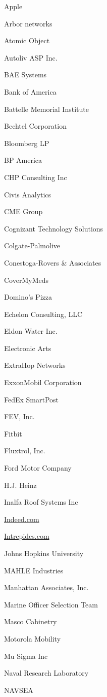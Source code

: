 \documentclass[twoside]{article}
\begin{document}
\begin{center}
\begin{multicols}{5}
\begin{FlushLeft}
\begin{compactitem}
\item Apple
\item Arbor networks
\item Atomic Object
\item Autoliv ASP Inc.
\item BAE Systems
\item Bank of America
\item Battelle Memorial Institute
\item Bechtel Corporation
\item Bloomberg LP
\item BP America
\item CHP Consulting Inc
\item Civis Analytics
\item CME Group
\item Cognizant Technology Solutions
\item Colgate-Palmolive
\item Conestoga-Rovers \& Associates
\item CoverMyMeds
\item Domino's Pizza
\item Echelon Consulting, LLC
\item Eldon Water Inc.
\item Electronic Arts
\item ExtraHop Networks
\item ExxonMobil Corporation
\item FedEx SmartPost
\item FEV, Inc.
\item Fitbit
\item Fluxtrol, Inc.
\item Ford Motor Company
\item H.J. Heinz
\item Inalfa Roof Systems Inc
\item \url{Indeed.com}
\item \url{Intrepidcs.com}
\item Johns Hopkins University
\item MAHLE Industries
\item Manhattan Associates, Inc.
\item Marine Officer Selection Team
\item Masco Cabinetry
\item Motorola Mobility
\item Mu Sigma Inc
\item Naval Research Laboratory
\item NAVSEA

\end{compactitem}
\end{FlushLeft}
\end{multicols}
\end{center}
\end{document}
